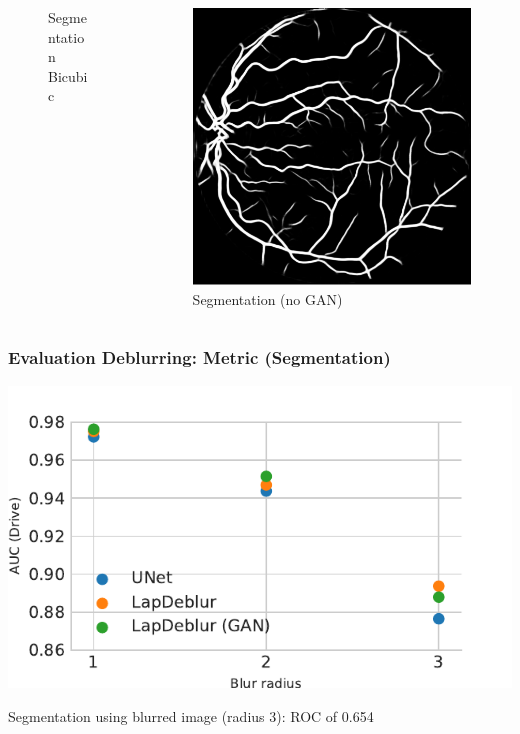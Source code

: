 \documentclass{beamer}
\begin{document}
\begin{frame}
\begin{columns}
\begin{column}{0.33\linewidth}
\begin{figure}[htb]
        \caption*{Segmentation Bicubic}
      \end{figure}
    \end{column}
  \begin{column}{0.33\linewidth}
      \centering
      \begin{figure}[htb]
        \centering
        \includegraphics[width=1.0\textwidth]{segmentation_nogan}
        \caption*{Segmentation (no GAN)}
      \end{figure}
    \end{column}
\end{columns}
\end{frame}

\begin{frame} \frametitle{Evaluation Deblurring: Metric (Segmentation)}
  \includegraphics{deblur_auc_beamer}

  Segmentation using blurred image (radius 3): ROC of 0.654
\end{frame}
\end{document}

